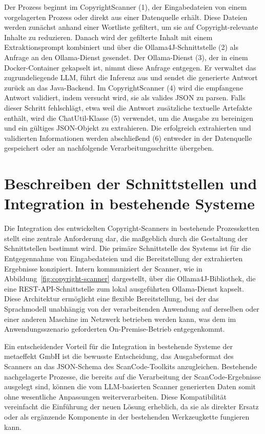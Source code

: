 Der Prozess beginnt im CopyrightScanner (1), der Eingabedateien von einem vorgelagerten Prozess oder direkt aus einer Datenquelle erhält.
Diese Dateien werden zunächst anhand einer Wortliste gefiltert, um sie auf Copyright-relevante Inhalte zu reduzieren.
Danach wird der gefilterte Inhalt mit einem Extraktionsprompt kombiniert und über die Ollama4J-Schnittstelle (2) als Anfrage an den Ollama-Dienst gesendet.
Der Ollama-Dienst (3), der in einem Docker-Container gekapselt ist, nimmt diese Anfrage entgegen.
Er verwaltet das zugrundeliegende LLM, führt die Inferenz aus und sendet die generierte Antwort zurück an das Java-Backend.
Im CopyrightScanner (4) wird die empfangene Antwort validiert, indem versucht wird, sie als valides JSON zu parsen.
Falls dieser Schritt fehlschlägt, etwa weil die Antwort zusätzliche textuelle Artefakte enthält, wird die ChatUtil-Klasse (5) verwendet, um die Ausgabe zu bereinigen und ein gültiges JSON-Objekt zu extrahieren.
Die erfolgreich extrahierten und validierten Informationen werden abschließend (6) entweder in der Datenquelle gespeichert oder an nachfolgende Verarbeitungsschritte übergeben.


\section{Beschreiben der Schnittstellen und Integration in bestehende Systeme}

Die Integration des entwickelten Copyright-Scanners in bestehende Prozessketten stellt eine zentrale Anforderung dar, die maßgeblich durch die Gestaltung der Schnittstellen bestimmt wird.
Die primäre Schnittstelle des Systems ist für die Entgegennahme von Eingabedateien und die Bereitstellung der extrahierten Ergebnisse konzipiert.
Intern kommuniziert der Scanner, wie in Abbildung~\ref{fig:copyright-scanner} dargestellt, über die Ollama4J-Bibliothek, die eine REST-API-Schnittstelle zum lokal ausgeführten Ollama-Dienst kapselt.
Diese Architektur ermöglicht eine flexible Bereitstellung, bei der das Sprachmodell unabhängig von der verarbeitenden Anwendung auf derselben oder einer anderen Maschine im Netzwerk betrieben werden kann, was dem im Anwendungsszenario geforderten On-Premise-Betrieb entgegenkommt.

Ein entscheidender Vorteil für die Integration in bestehende Systeme der metaeffekt GmbH ist die bewusste Entscheidung, das Ausgabeformat des Scanners an das JSON-Schema des ScanCode-Toolkits anzugleichen.
Bestehende nachgelagerte Prozesse, die bereits auf die Verarbeitung der ScanCode-Ergebnisse ausgelegt sind, können die vom LLM-basierten Scanner generierten Daten somit ohne wesentliche Anpassungen weiterverarbeiten.
Diese Kompatibilität vereinfacht die Einführung der neuen Lösung erheblich, da sie als direkter Ersatz oder als ergänzende Komponente in der bestehenden Werkzeugkette fungieren kann.

